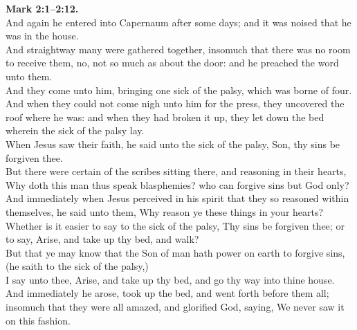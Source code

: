 \documentclass[10pt]{article} %
\begin{document}
{\begin{minipage}[t]{0.45\textwidth}
\textbf{Mark 2:1--2:12.}\\
And again he entered into Capernaum after some days; and it was noised that he was in the house.\\
And straightway many were gathered together, insomuch that there was no room to receive them, no, not so much as about the door: and he preached the word unto them.\\
And they come unto him, bringing one sick of the palsy, which was borne of four.\\
And when they could not come nigh unto him for the press, they uncovered the roof where he was: and when they had broken it up, they let down the bed wherein the sick of the palsy lay.\\
When Jesus saw their faith, he said unto the sick of the palsy, Son, thy sins be forgiven thee.\\
But there were certain of the scribes sitting there, and reasoning in their hearts,\\
Why doth this man thus speak blasphemies? who can forgive sins but God only?\\
And immediately when Jesus perceived in his spirit that they so reasoned within themselves, he said unto them, Why reason ye these things in your hearts?\\
Whether is it easier to say to the sick of the palsy, Thy sins be forgiven thee; or to say, Arise, and take up thy bed, and walk?\\
But that ye may know that the Son of man hath power on earth to forgive sins, (he saith to the sick of the palsy,)\\
I say unto thee, Arise, and take up thy bed, and go thy way into thine house.\\
And immediately he arose, took up the bed, and went forth before them all; insomuch that they were all amazed, and glorified God, saying, We never saw it on this fashion.\\

\end{minipage}}
\vspace*{\fill}
\newpage
\Huge%
\vspace*{\fill}
\end{document}
